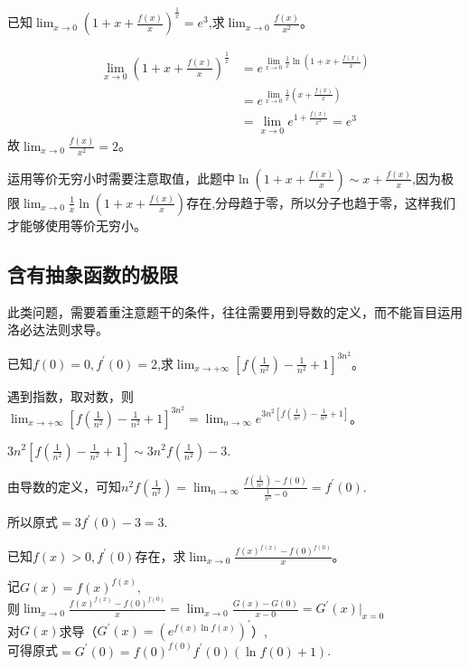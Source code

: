 \begin{example}
	已知$\lim_{x \to 0}(1+x+\frac{f(x)}{x})^{\frac{1}{x}}=e^3$,求$\lim_{x \to 0}\frac{f(x)}{x^2}$。
	\begin{solution}
		\begin{align*}
			\lim_{x \to 0}(1+x+\frac{f(x)}{x})^{\frac{1}{x}} &= e^{\lim_{x \to 0}\frac{1}{x}\ln(1+x+\frac{f(x)}{x})}\\
			&=e^{\lim_{x \to 0}\frac{1}{x}(x+\frac{f(x)}{x})}\\
			&=\lim_{x \to 0}e^{1+\frac{f(x)}{x^2}}=e^3
		\end{align*}
		故$\lim_{x \to 0}\frac{f(x)}{x^2}=2$。
	\end{solution}
\end{example}

\begin{remark}
	运用等价无穷小时需要注意取值，此题中$\ln (1+x+\frac{f(x)}{x})\sim x+\frac{f(x)}{x}$,因为极限$\lim_{x \to 0}\frac{1}{x}\ln(1+x+\frac{f(x)}{x})$存在,分母趋于零，所以分子也趋于零，这样我们才能够使用等价无穷小。
\end{remark}

\subsection{含有抽象函数的极限}
此类问题，需要着重注意题干的条件，往往需要用到导数的定义，而不能盲目运用洛必达法则求导。

\begin{example}
	已知$f(0)=0,f^{'}(0)=2$,求$\lim_{x \to +\infty}[f(\frac{1}{n^2})-\frac{1}{n^2}+1]^{3n^2}$。
	\begin{solution}
		遇到指数，取对数，则$\lim_{x \to +\infty}[f(\frac{1}{n^2})-\frac{1}{n^2}+1]^{3n^2}=\lim_{n \to \infty}e^{3n^2[f(\frac{1}{n^2})-\frac{1}{n^2}+1]}$。

$3n^2[f(\frac{1}{n^2})-\frac{1}{n^2}+1]\sim3n^2f(\frac{1}{n^2})-3$.

由导数的定义，可知$n^2f(\frac{1}{n^2})=\lim_{n \to \infty}\frac{f(\frac{1}{n^2})-f(0)}{\frac{1}{n^2}-0}=f^{'}(0)$.

所以原式$=3f^{'}(0)-3=3$.
	\end{solution}
\end{example}

\begin{example}
	已知$f(x)>0,f^{'}(0)$存在，求$\lim_{x \to 0}\frac{f(x)^{f(x)}-f(0)^{f(0)}}{x}$。
	\begin{solution}
		记$G(x)=f(x)^{f(x)},$\\
则$\lim_{x \to 0}\frac{f(x)^{f(x)}-f(0)^{f(0)}}{x}=\lim_{x \to 0}\frac{G(x)-G(0)}{x-0}=G^{'}(x)|_{x=0}$\\
对$G(x)$求导（$G^{'}(x)=(e^{f(x)\ln f(x)})^{'}$）,\\
可得原式$=G^{'}(0)=f(0)^{f(0)}f^{'}(0)(\ln f(0)+1)$.
	\end{solution}
\end{example}

